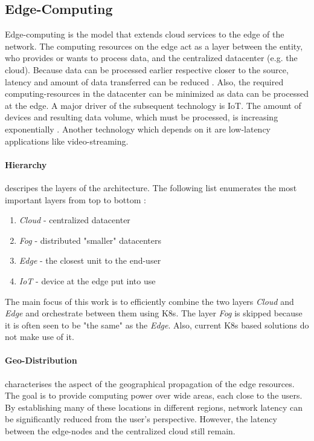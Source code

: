 \documentclass[MIC,Master,english]{twbook}%
\begin{document}
\subsection{Edge-Computing}
Edge-computing is the model that extends cloud services to the edge of the
network. The computing resources on the edge act as a layer between the entity, who provides or wants to process data, and the centralized datacenter (e.g. the cloud). Because data can be processed earlier respective closer to the source, latency and amount of data transferred can be reduced \cite{intro-edge}. Also, the required computing-resources in the datacenter can be minimized as data can be processed at the edge. A major driver of the subsequent technology is \ac{IoT}. The amount of devices and resulting data volume, which must be processed, is increasing exponentially \cite{SotE21}. Another technology which depends on it are low-latency applications like video-streaming. 

\paragraph{Hierarchy} descripes the layers of the architecture. The following list enumerates the most important layers from top to bottom \cite{intro-edge}:
\begin{enumerate}
    \item \textit{Cloud} - centralized datacenter
    \item \textit{Fog} - distributed "smaller" datacenters
    \item \textit{Edge} - the closest unit to the end-user
    \item \textit{\ac{IoT}} - device at the edge put into use
\end{enumerate}

The main focus of this work is to efficiently combine the two layers \textit{Cloud} and \textit{Edge} and orchestrate between them using \ac{K8s}. The layer \textit{Fog} is skipped because it is often seen to be "the same" as the \textit{Edge}. Also, current \ac{K8s} based solutions do not make use of it. 

\paragraph{Geo-Distribution} characterises the aspect of the geographical propagation of the edge resources. The goal is to provide computing power over wide areas, each close to the users. By establishing many of these locations in different regions, network latency can be significantly reduced from the user's perspective. However, the latency between the edge-nodes and the centralized cloud still remain.
\end{document}
